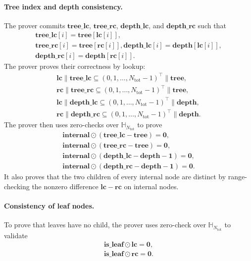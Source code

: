 \paragraph{Tree index and depth consistency.}
The prover commits $\mathbf{tree\_lc}$, $\mathbf{tree\_rc}$,
$\mathbf{depth\_lc}$, and $\mathbf{depth\_rc}$ such that
    \begin{align}
        \mathbf{tree\_lc}[i] = \mathbf{tree}[\mathbf{lc}[i]], \\
        \mathbf{tree\_rc}[i] = \mathbf{tree}[\mathbf{rc}[i]],
        \mathbf{depth\_lc}[i] = \mathbf{depth}[\mathbf{lc}[i]], \\
        \mathbf{depth\_rc}[i] = \mathbf{depth}[\mathbf{rc}[i]].
    \end{align}
The prover proves their correctness by lookup:
    \begin{align}
        \mathbf{lc}\| \mathbf{tree\_lc} \subseteq (0, 1, \dots, N_{\mathrm{tot}}-1)^\top \| \mathbf{tree},\\
        \mathbf{rc}\| \mathbf{tree\_rc} \subseteq (0, 1, \dots, N_{\mathrm{tot}}-1)^\top \| \mathbf{tree},\\
        \mathbf{lc}\| \mathbf{depth\_lc} \subseteq (0, 1, \dots, N_{\mathrm{tot}}-1)^\top \| \mathbf{depth},\\
        \mathbf{rc}\| \mathbf{depth\_rc} \subseteq (0, 1, \dots, N_{\mathrm{tot}}-1)^\top \| \mathbf{depth}.
    \end{align}
The prover then uses zero-checks over $\mathbb{H}_{N_{\mathrm{tot}}}$ to prove
    \begin{align}
        \mathbf{internal}\odot (\mathbf{tree\_lc}-\mathbf{tree}) = \mathbf{0}, \\
        \mathbf{internal}\odot (\mathbf{tree\_rc}-\mathbf{tree}) = \mathbf{0},\\
        \mathbf{internal}\odot (\mathbf{depth\_lc}-\mathbf{depth}-\mathbf{1}) = \mathbf{0},\\
        \mathbf{internal}\odot (\mathbf{depth\_rc}-\mathbf{depth}-\mathbf{1}) = \mathbf{0}.
    \end{align}
It also proves that the two children of every internal node are distinct by
range-checking the nonzero difference $\mathbf{lc}-\mathbf{rc}$ on internal
nodes.

\paragraph{Consistency of leaf nodes.}
To prove that leaves have no child, the prover uses zero-check over $\mathbb{H}_{N_{\mathrm{tot}}}$ to validate
    \begin{align}
        \mathbf{is\_leaf} \odot \mathbf{lc} = \mathbf{0}, \\
        \mathbf{is\_leaf} \odot \mathbf{rc} = \mathbf{0}.
    \end{align}

